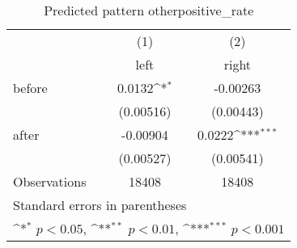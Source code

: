 \begin{table}[htbp]\centering
\def\sym#1{\ifmmode^{#1}\else\(^{#1}\)\fi}
\caption{Predicted pattern otherpositive\_rate}
\begin{tabular}{l*{2}{c}}
\hline\hline
                    &\multicolumn{1}{c}{(1)}&\multicolumn{1}{c}{(2)}\\
                    &\multicolumn{1}{c}{left}&\multicolumn{1}{c}{right}\\
\hline
before              &      0.0132\sym{*}  &    -0.00263         \\
                    &   (0.00516)         &   (0.00443)         \\
[1em]
after               &    -0.00904         &      0.0222\sym{***}\\
                    &   (0.00527)         &   (0.00541)         \\
\hline
Observations        &       18408         &       18408         \\
\hline\hline
\multicolumn{3}{l}{\footnotesize Standard errors in parentheses}\\
\multicolumn{3}{l}{\footnotesize \sym{*} \(p<0.05\), \sym{**} \(p<0.01\), \sym{***} \(p<0.001\)}\\
\end{tabular}
\end{table}
